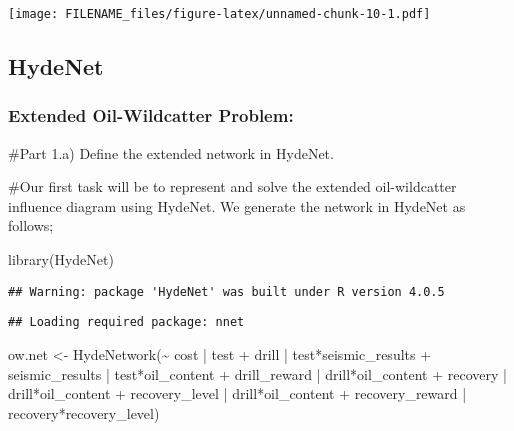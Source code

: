 \documentclass[
]{article}
\newenvironment{Shaded}{\begin{snugshade}}{\end{snugshade}}
\newcommand{\FunctionTok}[1]{\textcolor[rgb]{0.00,0.00,0.00}{#1}}
\newcommand{\NormalTok}[1]{#1}
\newcommand{\OtherTok}[1]{\textcolor[rgb]{0.56,0.35,0.01}{#1}}
\newcommand{\SpecialCharTok}[1]{\textcolor[rgb]{0.00,0.00,0.00}{#1}}
\begin{document}
\texttt{[image: FILENAME\_files/figure-latex/unnamed-chunk-10-1.pdf]}

\hypertarget{hydenet}{%
\subsection{HydeNet}\label{hydenet}}

\hypertarget{extended-oil-wildcatter-problem}{%
\subsubsection{Extended Oil-Wildcatter Problem:}\label{extended-oil-wildcatter-problem}}

\#Part 1.a) Define the extended network in HydeNet.

\#Our first task will be to represent and solve the extended oil-wildcatter influence diagram using HydeNet. We generate the network in HydeNet as follows;

\begin{Shaded}
\begin{Highlighting}[]
\FunctionTok{library}\NormalTok{(HydeNet)}
\end{Highlighting}
\end{Shaded}

\begin{verbatim}
## Warning: package 'HydeNet' was built under R version 4.0.5
\end{verbatim}

\begin{verbatim}
## Loading required package: nnet
\end{verbatim}

\begin{Shaded}
\begin{Highlighting}[]
\NormalTok{ow.net }\OtherTok{\textless{}{-}} \FunctionTok{HydeNetwork}\NormalTok{(}\SpecialCharTok{\textasciitilde{}}\NormalTok{ cost }\SpecialCharTok{|}\NormalTok{ test }
                      \SpecialCharTok{+}\NormalTok{ drill }\SpecialCharTok{|}\NormalTok{ test}\SpecialCharTok{*}\NormalTok{seismic\_results }
                      \SpecialCharTok{+}\NormalTok{ seismic\_results }\SpecialCharTok{|}\NormalTok{ test}\SpecialCharTok{*}\NormalTok{oil\_content }
                      \SpecialCharTok{+}\NormalTok{ drill\_reward }\SpecialCharTok{|}\NormalTok{ drill}\SpecialCharTok{*}\NormalTok{oil\_content }
                      \SpecialCharTok{+}\NormalTok{ recovery }\SpecialCharTok{|}\NormalTok{ drill}\SpecialCharTok{*}\NormalTok{oil\_content}
                      \SpecialCharTok{+}\NormalTok{ recovery\_level }\SpecialCharTok{|}\NormalTok{ drill}\SpecialCharTok{*}\NormalTok{oil\_content}
                      \SpecialCharTok{+}\NormalTok{ recovery\_reward }\SpecialCharTok{|}\NormalTok{ recovery}\SpecialCharTok{*}\NormalTok{recovery\_level)}
\end{Highlighting}
\end{Shaded}
\end{document}

